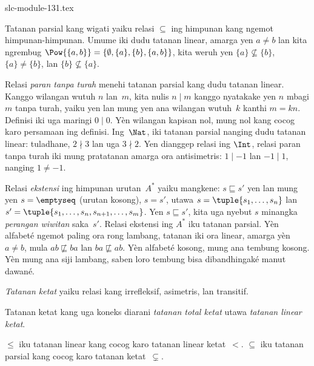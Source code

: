 \begin{filecontents*}[overwrite]{slc-module-131.tex}
\begin{ex}
Tatanan parsial kang wigati yaiku relasi $\subseteq$
ing himpunan kang ngemot himpunan-himpunan.
Umume iki dudu tatanan linear, amarga yen $a \neq b$
lan kita ngrembug
$\Pow{\{a, b\}} = \{\emptyset, \{a\}, \{b\}, \{a,b\}\}$,
kita weruh yen $\{a\} \nsubseteq \{b\}$,
$\{a\} \neq \{b\}$, lan $\{b\}\nsubseteq \{a\}$.
\end{ex}

\begin{ex}
Relasi \emph{paran tanpa turah} menehi tatanan
parsial kang dudu tatanan linear.
Kanggo wilangan wutuh $n$ lan~$m$,
kita nulis $n \mid m$ kanggo nyatakake yen $n$
mbagi $m$ tanpa turah, yaiku yen lan mung yen
ana wilangan wutuh~$k$ kanthi $m = kn$.
Definisi iki uga maringi $0\mid 0$. Yèn wilangan kapisan nol,
mung nol kang cocog karo persamaan ing definisi.
Ing~$\Nat$, iki tatanan parsial nanging dudu
tatanan linear: tuladhane, $2 \nmid 3$ lan uga
$3 \nmid 2$. Yen dianggep relasi ing $\Int$,
relasi paran tanpa turah iki mung pratatanan amarga ora
antisimetris: $1 \mid -1$ lan $-1 \mid 1$,
nanging $1 \neq -1$.
\end{ex}

\begin{ex}
Relasi \emph{ekstensi} ing himpunan urutan~$A^*$
yaiku mangkene: $s \sqsubseteq s'$ yen lan mung yen
$s = \emptyseq$ (urutan kosong), $s = s'$,
utawa $s = \tuple{s_1, \dots, s_n}$ lan
$s' =\tuple{s_1, \dots, s_n, s_{n+1}, \dots, s_m}$.
Yen $s \sqsubseteq s'$, kita uga nyebut $s$
minangka \emph{perangan wiwitan} saka~$s'$.
Relasi ekstensi ing $A^*$ iku tatanan parsial.
Yèn alfabeté ngemot paling ora rong lambang, tatanan iki
ora linear, amarga yèn
$a \neq b$, mula $ab \not\sqsubseteq ba$ lan
$ba \not\sqsubseteq ab$. Yèn alfabeté kosong, mung ana tembung kosong.
Yèn mung ana siji lambang, saben loro tembung bisa dibandhingaké
manut dawané.
\end{ex}

\begin{defn}
\emph{Tatanan ketat} yaiku relasi kang irrefleksif,
asimetris, lan transitif.
\end{defn}

\begin{defn}
Tatanan ketat kang uga koneks diarani
\emph{tatanan total ketat} utawa \emph{tatanan linear ketat}.
\end{defn}

\begin{ex}
$\le$ iku tatanan linear kang cocog karo
tatanan linear ketat~$<$.
$\subseteq$ iku tatanan parsial kang cocog karo
tatanan ketat~$\subsetneq$.
\end{ex}


\end{filecontents*}
